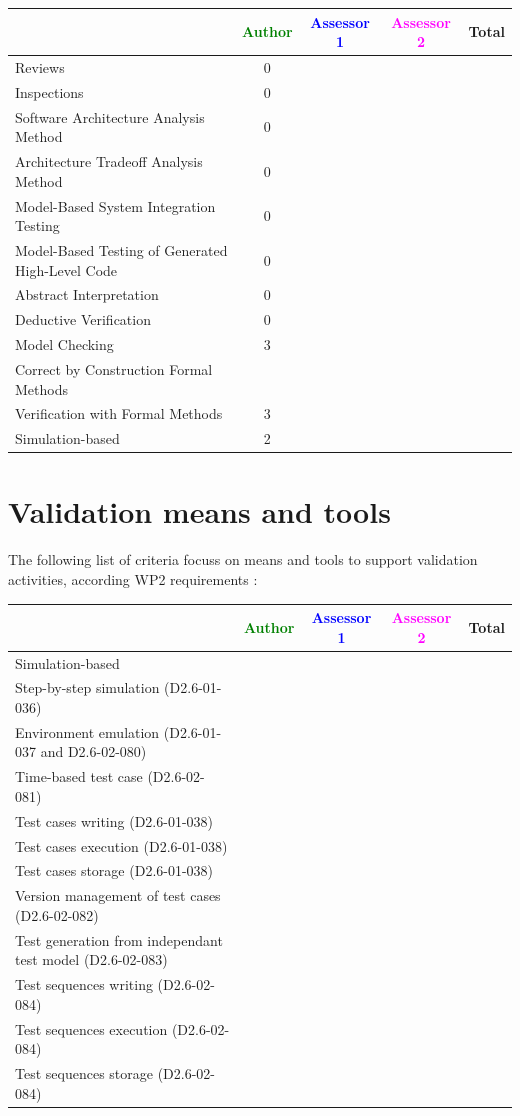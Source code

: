 \begin{tabular}{|l | c | c | c | c|}
\hline
& \textcolor{green}{Author} & \textcolor{blue}{Assessor 1} & \textcolor{magenta}{Assessor 2} & Total \\
\hline 
Reviews & 0 & & &  \\
\hline
Inspections & 0 & & &  \\
\hline
Software Architecture Analysis Method & 0 & & &  \\
\hline
Architecture Tradeoff Analysis Method & 0 & & &  \\
\hline
Model-Based System Integration Testing & 0 & & &  \\
\hline
Model-Based Testing of Generated High-Level Code & 0 & & &  \\
\hline
Abstract Interpretation & 0 & & &  \\
\hline
Deductive Verification & 0 & & &  \\
\hline
Model Checking & 3 & & &  \\
\hline
Correct by Construction Formal Methods & & & &  \\
\hline
Verification with Formal Methods & 3 & & &  \\
\hline
Simulation-based & 2 & & &  \\
\hline
\end{tabular}

\section{Validation means and tools}

The following list of criteria focuss on means and tools to support validation activities, according WP2  requirements :

\begin{tabular}{|l | c | c | c | c|}
\hline
& \textcolor{green}{Author} & \textcolor{blue}{Assessor 1} & \textcolor{magenta}{Assessor 2} & Total \\
\hline 
Simulation-based & & & &  \\
\hline
Step-by-step simulation (D2.6-01-036) & & & &  \\
\hline
Environment emulation (D2.6-01-037 and D2.6-02-080) & & & &  \\
\hline
Time-based test case (D2.6-02-081) & & & &  \\
\hline
Test cases writing (D2.6-01-038) & & & &  \\
\hline
Test cases execution (D2.6-01-038) & & & &  \\
\hline
Test cases storage (D2.6-01-038) & & & &  \\
\hline
Version management of test cases (D2.6-02-082) & & & &  \\
\hline
Test generation from independant test model (D2.6-02-083) & & & &  \\
\hline
Test sequences writing (D2.6-02-084) & & & &  \\
\hline
Test sequences execution (D2.6-02-084) & & & &  \\
\hline
Test sequences storage (D2.6-02-084) & & & &  \\
\hline
\end{tabular}

